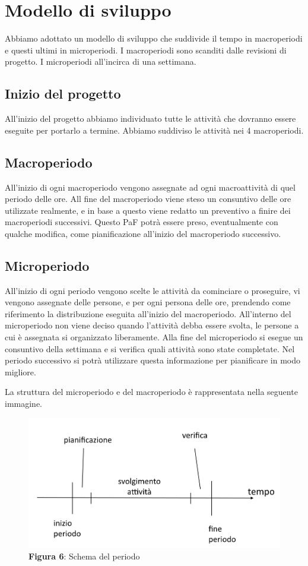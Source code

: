 \section{Modello di sviluppo}
Abbiamo adottato un modello di sviluppo che suddivide il tempo in macroperiodi e questi ultimi in microperiodi. I macroperiodi sono scanditi dalle revisioni di progetto. I microperiodi all'incirca di una settimana.

\subsection{Inizio del progetto}
All'inizio del progetto abbiamo individuato tutte le attività che dovranno essere eseguite per portarlo a termine.
Abbiamo suddiviso le attività nei 4 macroperiodi.
\subsection{Macroperiodo}
All'inizio di ogni macroperiodo vengono assegnate ad ogni macroattività di quel periodo delle ore.
All fine del macroperiodo viene steso un consuntivo delle ore utilizzate realmente, e in base a questo viene redatto un preventivo a finire dei macroperiodi successivi. Questo PaF potrà essere preso, eventualmente con qualche modifica, come pianificazione all'inizio del macroperiodo successivo.
\subsection{Microperiodo}
All'inizio di ogni periodo vengono scelte le attività da cominciare o proseguire, vi vengono assegnate delle persone, e per ogni persona delle ore, prendendo come riferimento la distribuzione eseguita all'inizio del macroperiodo. \newline
\indent All'interno del microperiodo non viene deciso quando l'attività debba essere svolta, le persone a cui è assegnata si organizzato liberamente. \newline
\indent Alla fine del microperiodo si esegue un consuntivo della settimana e si verifica quali attività sono state completate. Nel periodo successivo si potrà utilizzare questa informazione per pianificare in modo migliore.

La struttura del microperiodo e del macroperiodo è rappresentata nella seguente immagine.
\begin{figure}[H]
	\centering
	\includegraphics[width=0.7\linewidth]{res/images/schema_periodo.png}
	\caption*{\textbf{Figura 6}: Schema del periodo}
	\label{fig:Figura2}
\end{figure}

